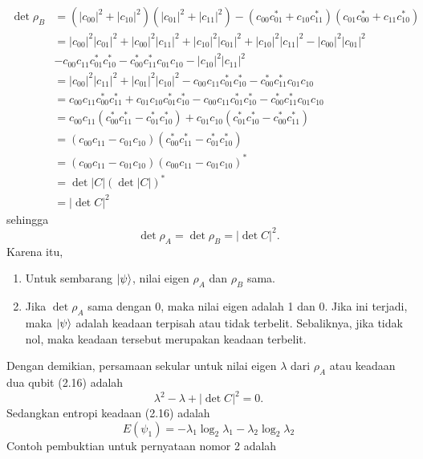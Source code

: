 \begin{equation}
	\begin{aligned}
		\det \rho_B
		&= (|c_{00}|^2 + |c_{10}|^2)(|c_{01}|^2 + |c_{11}|^2)
		- (c_{00} c^{*}_{01} + c_{10} c^{*}_{11})
		(c_{01} c^{*}_{00} + c_{11} c^{*}_{10})\\
		&= |c_{00}|^2 |c_{01}|^2
		+ |c_{00}|^2 |c_{11}|^2
		+ |c_{10}|^2 |c_{01}|^2
		+ |c_{10}|^2 |c_{11}|^2- |c_{00}|^2 |c_{01}|^2\\
		&- c_{00} c_{11} c^{*}_{01} c^{*}_{10}
		- c^{*}_{00} c^{*}_{11} c_{01} c_{10}- |c_{10}|^2 |c_{11}|^2\\
		&= |c_{00}|^2 |c_{11}|^2
		+ |c_{01}|^2 |c_{10}|^2
		- c_{00} c_{11} c^{*}_{01} c^{*}_{10}
		- c^{*}_{00} c^{*}_{11} c_{01} c_{10}\\
		&=c_{00} c_{11} c^{*}_{00} c^{*}_{11}
		+ c_{01} c_{10} c^{*}_{01} c^{*}_{10}-c_{00} c_{11} c^{*}_{01} c^{*}_{10}-c^{*}_{00} c^{*}_{11}c_{01} c_{10} \\
		&= c_{00}c_{11}(c^{*}_{00} c^{*}_{11} - c^{*}_{01} c^{*}_{10})+c_{01}c_{10}(c^{*}_{01} c^{*}_{10} - c^{*}_{00} c^{*}_{11})\\
		&= (c_{00} c_{11} - c_{01} c_{10})
		(c^{*}_{00} c^{*}_{11} - c^{*}_{01} c^{*}_{10})\\
		&= (c_{00} c_{11} - c_{01} c_{10})
		(c_{00} c_{11} - c_{01} c_{10})^{*}\\
		&= \det |C| (\det |C|)^{*}\\
		&= |\det C|^2
	\end{aligned}
\end{equation}
sehingga
\begin{equation}
	\det \rho_A = \det \rho_B = |\det C|^2.
\end{equation}
Karena itu,
\begin{enumerate}
	\item Untuk sembarang $\ket{\psi}$, nilai eigen $\rho_{A}$ dan $\rho_{B}$ sama.
	\item Jika $\det\rho_{A}$ sama dengan 0, maka nilai eigen adalah 1 dan 0. Jika ini terjadi, maka $\ket{\psi}$ adalah keadaan terpisah atau tidak terbelit. Sebaliknya, jika tidak nol, maka keadaan tersebut merupakan keadaan terbelit.
\end{enumerate}
Dengan demikian, persamaan sekular untuk nilai eigen $\lambda$ dari $\rho_{A}$ atau keadaan dua qubit (2.16) adalah
\begin{equation}
	\lambda^2-\lambda+|\det C|^2=0.
\end{equation}
Sedangkan entropi keadaan (2.16) adalah
\begin{equation}
	E(\psi_1)=-\lambda_1\log_2\lambda_1-\lambda_2\log_2\lambda_2
\end{equation}
Contoh pembuktian untuk pernyataan nomor 2 adalah

